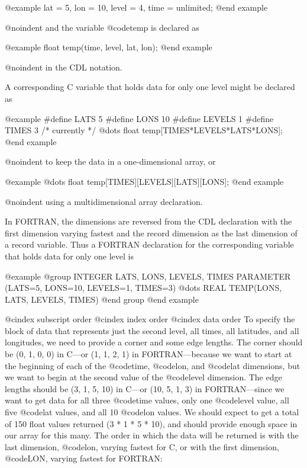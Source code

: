 @example
        lat = 5, lon = 10, level = 4, time = unlimited;
@end example

@noindent
and the variable @code{temp} is declared as

@example
        float   temp(time, level, lat, lon);
@end example

@noindent
in the CDL notation.

A corresponding C variable that holds data for only one level might be
declared as

@example
#define LATS  5
#define LONS 10
#define LEVELS 1
#define TIMES 3                 /* currently */
    @dots{}
float   temp[TIMES*LEVELS*LATS*LONS];
@end example

@noindent
to keep the data in a one-dimensional array, or

@example
    @dots{}
float   temp[TIMES][LEVELS][LATS][LONS];
@end example

@noindent
using a multidimensional array declaration.

In FORTRAN, the dimensions are reversed from the CDL declaration with the
first dimension varying fastest and the record dimension as the last
dimension of a record variable.  Thus a FORTRAN declaration for the
corresponding variable that holds data for only one level is

@example
@group
      INTEGER LATS, LONS, LEVELS, TIMES
      PARAMETER (LATS=5, LONS=10, LEVELS=1, TIMES=3)
         @dots{}
      REAL TEMP(LONS, LATS, LEVELS, TIMES)
@end group
@end example

@cindex subscript order
@cindex index order
@cindex data order
To specify the block of data that represents just the second level, all
times, all latitudes, and all longitudes, we need to provide a corner
and some edge lengths.  The corner should be (0, 1, 0, 0) in C---or (1,
1, 2, 1) in FORTRAN---because we want to start at the beginning of each
of the @code{time}, @code{lon}, and @code{lat} dimensions, but we want
to begin at the second value of the @code{level} dimension.  The edge
lengths should be (3, 1, 5, 10) in C---or (10, 5, 1, 3) in
FORTRAN---since we want to get data for all three @code{time} values,
only one @code{level} value, all five @code{lat} values, and all 10
@code{lon} values.  We should expect to get a total of 150 float values
returned (3 * 1 * 5 * 10), and should provide enough space in our array
for this many.  The order in which the data will be returned is with the
last dimension, @code{lon}, varying fastest for C, or with the first
dimension, @code{LON}, varying fastest for FORTRAN:

